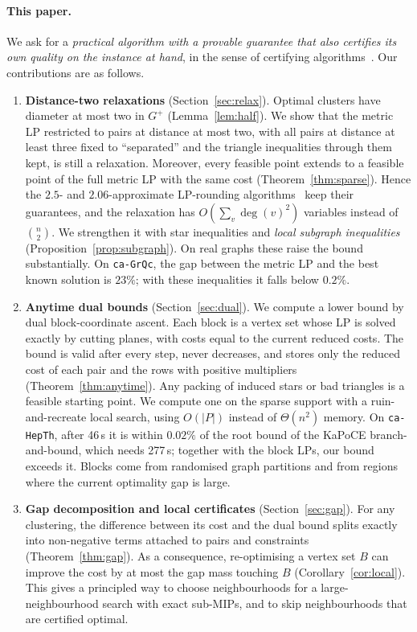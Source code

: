 \documentclass[11pt]{article}
\theoremstyle{definition}
\begin{document}
\paragraph{This paper.}  We ask for a \emph{practical algorithm with a
provable guarantee that also certifies its own quality on the instance at
hand}, in the sense of certifying algorithms~\citep{McConnellMNS11}.  Our
contributions are as follows.

\begin{enumerate}
\item \textbf{Distance-two relaxations} (Section~\ref{sec:relax}).  Optimal
clusters have diameter at most two in $G^+$ (Lemma~\ref{lem:half}).  We show
that the metric LP restricted to pairs at distance at most two, with all pairs
at distance at least three fixed to ``separated'' and the triangle
inequalities through them kept, is still a relaxation.  Moreover, every
feasible point extends to a feasible point of the full metric LP with the same
cost (Theorem~\ref{thm:sparse}).  Hence the $2.5$- and $2.06$-approximate
LP-rounding algorithms~\citep{AilonCN08,ChawlaMSY15} keep their guarantees,
and the relaxation has $O(\sum_v\deg(v)^2)$ variables instead of
$\binom{n}{2}$.  We strengthen it with star inequalities and \emph{local
subgraph inequalities} (Proposition~\ref{prop:subgraph}).  On real graphs
these raise the bound substantially.  On \texttt{ca-GrQc}, the gap between
the metric LP and the best known solution is $23\%$; with these inequalities
it falls below $0.2\%$.

\item \textbf{Anytime dual bounds} (Section~\ref{sec:dual}).  We compute a
lower bound by dual block-coordinate ascent.  Each block is a vertex set whose
LP is solved exactly by cutting planes, with costs equal to the current
reduced costs.  The bound is valid after every step, never decreases, and
stores only the reduced cost of each pair and the rows with positive
multipliers (Theorem~\ref{thm:anytime}).  Any packing of induced stars or bad
triangles is a feasible starting point.  We compute one on the sparse support with a
ruin-and-recreate local search, using $O(|P|)$ instead of $\Theta(n^2)$
memory.  On \texttt{ca-HepTh}, after 46\,s it is within $0.02\%$ of the
root bound of the KaPoCE branch-and-bound, which needs 277\,s; together with
the block LPs, our bound exceeds it.  Blocks come from randomised
graph partitions and from regions where the current optimality gap is large.

\item \textbf{Gap decomposition and local certificates}
(Section~\ref{sec:gap}).  For any clustering, the difference between its cost
and the dual bound splits exactly into non-negative terms attached to pairs
and constraints (Theorem~\ref{thm:gap}).  As a consequence, re-optimising a
vertex set $B$ can improve the cost by at most the gap mass touching $B$
(Corollary~\ref{cor:local}).  This gives a principled way to choose
neighbourhoods for a large-neighbourhood search with exact sub-MIPs, and to
skip neighbourhoods that are certified optimal.


\end{enumerate}
\end{document}

